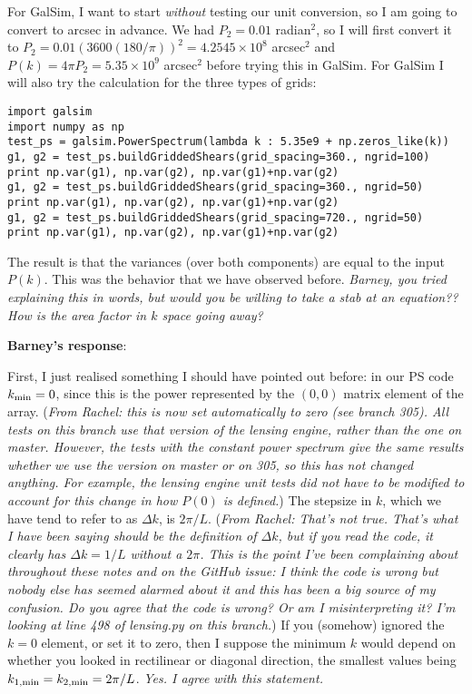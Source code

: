 \documentclass[preprint]{aastex}
\begin{document}
For GalSim, I want to start {\em without} testing our unit conversion,
so I am going to convert to arcsec in advance.  We had $P_2=0.01$
radian$^2$, so I will first convert it to
$P_2=0.01 (3600(180/\pi))^2=4.2545\times 10^8$ arcsec$^2$ and
$P(k)=4\pi P_2 = 5.35\times 10^9$ arcsec$^2$ before trying this in
GalSim.  For GalSim I will also try the calculation for the three
types of grids:
\begin{verbatim}
import galsim
import numpy as np
test_ps = galsim.PowerSpectrum(lambda k : 5.35e9 + np.zeros_like(k))
g1, g2 = test_ps.buildGriddedShears(grid_spacing=360., ngrid=100)
print np.var(g1), np.var(g2), np.var(g1)+np.var(g2)
g1, g2 = test_ps.buildGriddedShears(grid_spacing=360., ngrid=50)
print np.var(g1), np.var(g2), np.var(g1)+np.var(g2)
g1, g2 = test_ps.buildGriddedShears(grid_spacing=720., ngrid=50)
print np.var(g1), np.var(g2), np.var(g1)+np.var(g2)
\end{verbatim}
The result is that the variances (over both components) are equal to
the input $P(k)$.  This was the behavior that we have observed before.  {\em Barney, you tried explaining
  this in words, but would you be willing to take a stab at an
  equation??  How is the area factor in $k$ space going away?}

\textbf{Barney's response}:

First, I just realised something I should have pointed out before: in
our PS code $k_{\rm min} = 0$, since this is the power represented by
the $(0, 0)$ matrix element of the array.  
({\em From Rachel: this is now set automatically to zero (see branch
  305).  All tests on this branch use that version of the lensing
  engine, rather than the one on master.  However, the tests with the
  constant power spectrum give the same results whether we use the
  version on master or on 305, so this has not changed anything.  For
  example, the lensing engine unit tests did not have to be modified
  to account for this change in how $P(0)$ is defined.})
The stepsize in $k$, which
we have tend to refer to as $\Delta k$, is $2 \pi / L$.  ({\em From
  Rachel: That's not true.  That's what I have been saying should be
  the definition of $\Delta k$,
  but if you read the code, it clearly has $\Delta k =1/L$ without a $2\pi$.  This is
  the point I've been complaining about throughout these notes and on
  the GitHub issue: I
  think the code is wrong but nobody else has seemed alarmed
  about it and this has been a big source of my confusion.  Do you
  agree that the code is wrong?  Or am I misinterpreting it?  I'm
  looking at line 498 of lensing.py on this branch.})  If you
(somehow) ignored the $k=0$ element, or set it to zero, then I suppose
the minimum $k$ would depend on whether you looked in rectilinear or diagonal direction,
the smallest values being $k_{1, \rm min} = k_{2, \rm min} = 2 \pi /
L$.  {\em Yes.  I agree with this statement.}
\end{document}

